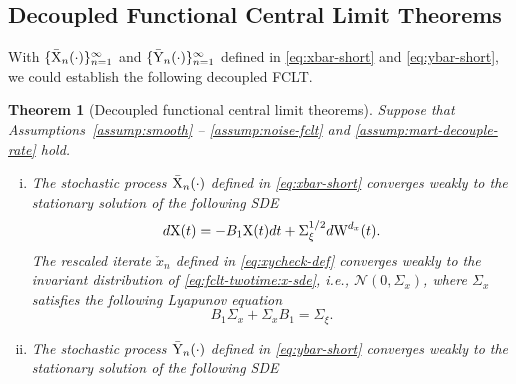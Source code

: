 \documentclass[11pt]{article}
\theoremstyle{plain}
\newtheorem{thm}{Theorem}[section]
\theoremstyle{definition}
\def\invdiffslow{\tilde{\beta}}
\def\ermW{{\textnormal{W}}}
\def\ermX{{\textnormal{X}}}
\def\ermY{{\textnormal{Y}}}
\def\mI{{\bm{I}}}
\def\NM{{\mathcal N}}
\newcommand{\xcheck}{{\check{x}}}
\newcommand{\xbar}{{\bar{\textnormal{X}}}}
\newcommand{\ybar}{{\bar{\textnormal{Y}}}}
\newcommand{\zbar}{{\bar{\textnormal{Z}}}}
\def\mI{{I}}
\begin{document}
\subsection{Decoupled Functional Central Limit Theorems}

\label{sec:fclt:theo}

With $\{ \xbar_{n}(\cdot) \}_{n=1}^\infty$ and $\{ \ybar_{n}(\cdot) \}_{n=1}^\infty$ defined in \eqref{eq:xbar-short} and \eqref{eq:ybar-short}, we could establish the following decoupled FCLT.

\begin{thm}[Decoupled functional central limit theorems]\label{thm:fclt-twotime}
	Suppose that Assumptions~\ref{assump:smooth} -- \ref{assump:noise-fclt} and \ref{assump:mart-decouple-rate} hold.
	\begin{enumerate}[(i)]
		\item \label{thm:fclt-x} The stochastic process $\xbar_{n}(\cdot)$ defined in \eqref{eq:xbar-short} converges weakly to the stationary solution of the following SDE 
		\begin{equation}\label{eq:fclt-twotime:x-sde}
			d \ermX(t) = - B_1 \ermX(t) dt + \Sigma_{\xi}^{1/2} d \ermW^{d_x}(t).
		\end{equation}
		The rescaled iterate $ \xcheck_{n} $ defined in \eqref{eq:xycheck-def} converges weakly to the invariant distribution of \eqref{eq:fclt-twotime:x-sde}, i.e., $\NM(0, \Sigma_x)$, where $\Sigma_x$ satisfies the following Lyapunov equation 
		\begin{equation}\label{eq:fclt-twotime:x-var}
			B_1 \Sigma_x + \Sigma_x B_1 = \Sigma_{\xi}.
		\end{equation}
		\item \label{thm:fclt-y} The stochastic process $\ybar_{n}(\cdot)$ defined in \eqref{eq:ybar-short} converges weakly to the stationary solution of the following SDE 

\end{enumerate}
\end{thm}
\end{document}
